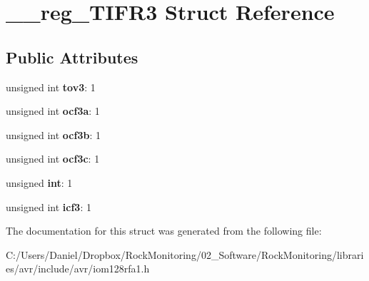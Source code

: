 \hypertarget{struct____reg___t_i_f_r3}{}\section{\+\_\+\+\_\+reg\+\_\+\+T\+I\+F\+R3 Struct Reference}
\label{struct____reg___t_i_f_r3}
\subsection*{Public Attributes}
\begin{DoxyCompactItemize}
\item 
unsigned int {\bfseries tov3}\+: 1\hypertarget{struct____reg___t_i_f_r3_ad0ee43ce53c7f262a5e2f117ec1518f6}{}\label{struct____reg___t_i_f_r3_ad0ee43ce53c7f262a5e2f117ec1518f6}

\item 
unsigned int {\bfseries ocf3a}\+: 1\hypertarget{struct____reg___t_i_f_r3_af0b22d8d8a65070058cf6321460ba306}{}\label{struct____reg___t_i_f_r3_af0b22d8d8a65070058cf6321460ba306}

\item 
unsigned int {\bfseries ocf3b}\+: 1\hypertarget{struct____reg___t_i_f_r3_aa90879b523a21f193b3c867b7ce86838}{}\label{struct____reg___t_i_f_r3_aa90879b523a21f193b3c867b7ce86838}

\item 
unsigned int {\bfseries ocf3c}\+: 1\hypertarget{struct____reg___t_i_f_r3_ad7f9110ee15bacc79c5d6fa3360bdadb}{}\label{struct____reg___t_i_f_r3_ad7f9110ee15bacc79c5d6fa3360bdadb}

\item 
unsigned {\bfseries int}\+: 1\hypertarget{struct____reg___t_i_f_r3_a59d0ca2da121fcca1bdd1a9a5439b5cc}{}\label{struct____reg___t_i_f_r3_a59d0ca2da121fcca1bdd1a9a5439b5cc}

\item 
unsigned int {\bfseries icf3}\+: 1\hypertarget{struct____reg___t_i_f_r3_aa80ddaf3a93e44be34286971360eae79}{}\label{struct____reg___t_i_f_r3_aa80ddaf3a93e44be34286971360eae79}

\end{DoxyCompactItemize}


The documentation for this struct was generated from the following file\+:\begin{DoxyCompactItemize}
\item 
C\+:/\+Users/\+Daniel/\+Dropbox/\+Rock\+Monitoring/02\+\_\+\+Software/\+Rock\+Monitoring/libraries/avr/include/avr/iom128rfa1.\+h\end{DoxyCompactItemize}

